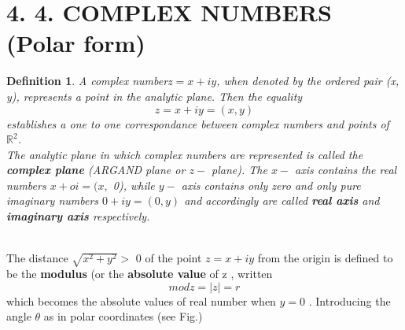 \documentclass[11 pt]{amsbook}
\newtheorem{definition}{Definition}
\begin{document}
\section{4. 4. COMPLEX NUMBERS (Polar form)}
\begin{definition}
A complex number$ z = x + iy$, when denoted by the ordered pair (x, y), represents a point  in the analytic plane. Then the equality 
\begin{equation}
z = x + iy = (x, y) 
\end{equation}
establishes  a one to one correspondance between complex numbers and points of ${\mathbb{R}^2}$. \\
The analytic plane in which complex numbers are represented is called the \textbf{complex plane} (ARGAND plane or $z -$ plane). The $x -$ axis contains the real numbers $x+ oi = (x,$ 0), while $y -$ axis contains only zero and only pure imaginary  numbers      
$0 + iy = (0, y)$ and accordingly are called \textbf{real axis} and \textbf{imaginary axis} respectively. \\
\end{definition}
\\The distance $\sqrt{{x^2}+{y^2}} >$ 0 of the point $z= x + iy$ from the origin is defined to be the \textbf{modulus} (or  the \textbf{absolute value} of z , written 
\begin{equation}
mod z =  |z| = r
\end{equation}
which becomes the absolute values of real number when $y = 0 $ . Introducing the angle $\theta$ as in polar coordinates (see Fig.)
\end{document}
